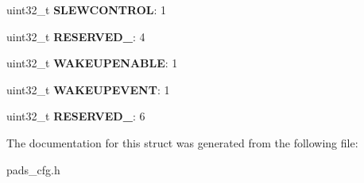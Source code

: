 \begin{DoxyCompactItemize}
\item 
\hypertarget{structCTRL__CORE__PAD_a05684dc4713d3937290c1e62fd1852d6}{uint32\-\_\-t {\bfseries S\-L\-E\-W\-C\-O\-N\-T\-R\-O\-L}\-: 1}\label{structCTRL__CORE__PAD_a05684dc4713d3937290c1e62fd1852d6}

\item 
\hypertarget{structCTRL__CORE__PAD_af339e4d0ecf6f07b86d8ab396fe4e4a2}{uint32\-\_\-t {\bfseries R\-E\-S\-E\-R\-V\-E\-D\-\_}\-: 4}\label{structCTRL__CORE__PAD_af339e4d0ecf6f07b86d8ab396fe4e4a2}

\item 
\hypertarget{structCTRL__CORE__PAD_a137d2caf43fc3b69cfb1df978b1b07fa}{uint32\-\_\-t {\bfseries W\-A\-K\-E\-U\-P\-E\-N\-A\-B\-L\-E}\-: 1}\label{structCTRL__CORE__PAD_a137d2caf43fc3b69cfb1df978b1b07fa}

\item 
\hypertarget{structCTRL__CORE__PAD_a99014ed64b60a049ed03ec9421b529cc}{uint32\-\_\-t {\bfseries W\-A\-K\-E\-U\-P\-E\-V\-E\-N\-T}\-: 1}\label{structCTRL__CORE__PAD_a99014ed64b60a049ed03ec9421b529cc}

\item 
\hypertarget{structCTRL__CORE__PAD_a9c66e59b45bff57573869a0b526958eb}{uint32\-\_\-t {\bfseries R\-E\-S\-E\-R\-V\-E\-D\-\_}\-: 6}\label{structCTRL__CORE__PAD_a9c66e59b45bff57573869a0b526958eb}

\end{DoxyCompactItemize}


The documentation for this struct was generated from the following file\-:\begin{DoxyCompactItemize}
\item 
pads\-\_\-cfg.\-h\end{DoxyCompactItemize}
